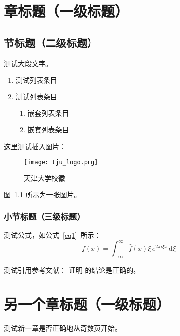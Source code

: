 
\chapter{章标题（一级标题）}

\section{节标题（二级标题）}

测试大段文字。\zhlipsum[5-8] %

\begin{enumerate}[（1）]
    \item 测试列表条目
    \item 测试列表条目 
    \begin{enumerate}[（i）]
        \item 嵌套列表条目
        \item 嵌套列表条目
    \end{enumerate}
\end{enumerate}

这里测试插入图片：
\begin{figure}[!h]
    \centering\small
    \texttt{[image: tju\_logo.png]}
    \caption{天津大学校徽}
    \label{fig:logo}
\end{figure}
图~\ref{fig:logo} 所示为一张图片。

\subsection{小节标题（三级标题）}

测试公式，如公式~\eqref{eq1}~所示：
\begin{equation}\label{eq1}
    f(x) = \int_{-\infty}^\infty  \hat f(x)\xi\,e^{2 \pi i \xi x}  \,\mathrm{d}\xi 
\end{equation}

测试引用参考文献：\citet{mittelbach2004} 证明 \citet{kottwitz2015} 的结论是正确的\citep{张琪昌2005}。

\chapter{另一个章标题（一级标题）}

测试新一章是否正确地从奇数页开始。